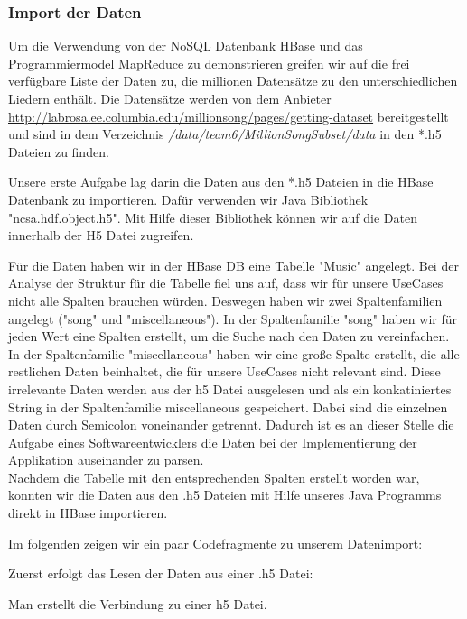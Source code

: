 \subsubsection{Import der Daten}
Um die Verwendung von der NoSQL Datenbank HBase und das Programmiermodel MapReduce zu demonstrieren greifen wir auf die frei verfügbare Liste der Daten zu, die millionen Datensätze zu den unterschiedlichen Liedern enthält. Die Datensätze werden von dem Anbieter \url{http://labrosa.ee.columbia.edu/millionsong/pages/getting-dataset} bereitgestellt und  sind in dem Verzeichnis \textit{/data/team6/MillionSongSubset/data} in den *.h5 Dateien zu finden. 

Unsere erste Aufgabe lag darin die Daten aus den *.h5 Dateien in die HBase Datenbank zu importieren.
Dafür verwenden wir Java Bibliothek "ncsa.hdf.object.h5". Mit Hilfe dieser Bibliothek können wir auf die Daten innerhalb der H5 Datei zugreifen.

Für die Daten haben wir in der HBase DB eine Tabelle "Music" angelegt. Bei der Analyse der Struktur für die Tabelle fiel uns auf, dass wir für unsere UseCases nicht alle Spalten brauchen würden. Deswegen haben wir zwei Spaltenfamilien angelegt ("song" und "miscellaneous"). In der Spaltenfamilie "song" haben wir für jeden Wert eine Spalten erstellt, um die Suche nach den Daten zu vereinfachen. In der Spaltenfamilie "miscellaneous" haben wir eine große Spalte erstellt, die alle restlichen Daten beinhaltet, die für unsere UseCases nicht relevant sind. Diese irrelevante Daten werden aus der h5 Datei ausgelesen und als ein konkatiniertes String in der Spaltenfamilie miscellaneous gespeichert. Dabei sind die einzelnen Daten durch Semicolon voneinander getrennt. Dadurch ist es an dieser Stelle die Aufgabe eines Softwareentwicklers die Daten bei der Implementierung der Applikation auseinander zu parsen.\\
Nachdem die Tabelle mit den entsprechenden Spalten erstellt worden war, konnten wir die Daten aus den .h5 Dateien mit Hilfe unseres Java Programms direkt in HBase importieren.

Im folgenden zeigen wir ein paar Codefragmente zu unserem Datenimport:

Zuerst erfolgt das Lesen der Daten aus einer .h5 Datei:

Man erstellt die Verbindung zu einer h5 Datei.


